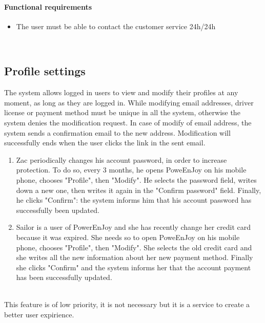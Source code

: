 \paragraph {Functional requirements }
\begin{itemize}
	\item The user must be able to contact the customer service 24h/24h
\end{itemize}
 \ \\
\newpage

\subsection{Profile settings}
The system allows logged in users to view and modify their profiles at any moment, as long as they are logged in. While modifying email addresses, driver license or payment method must be unique in all the system, otherwise the system denies the modification request. In case of modify of email address, the system sends a confirmation email to the new address. Modification will successfully ends when the user clicks the link in the sent email.
 \ \\
\begin{enumerate}
	\item  Zac periodically changes his account password, in order to increase protection. To do so, every 3 months, he opens PoweEnJoy on his mobile phone, chooses "Profile", then "Modify". He selects the password field, writes down a new one, then writes it again in the "Confirm password" field. Finally, he clicks "Confirm": the system informs him that his account password has successfully been updated.
	\item Sailor is a user of PowerEnJoy and she has recently change her credit card because it was expired. She needs so to open PoweEnJoy on his mobile phone, chooses "Profile", then "Modify". She selects the old credit card and she writes all the new information about her new payment method. Finally she clicks "Confirm" and the system informs her that the account payment has been successfully updated.
\end{enumerate}
 \ \\
This feature is of low priority, it is not necessary but it is a service to create a better user expirience.
